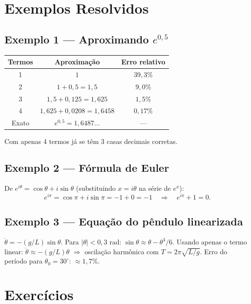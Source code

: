 \documentclass[12pt,a4paper]{article}
\begin{document}
\section*{Exemplos Resolvidos}

\subsection*{Exemplo 1 --- Aproximando $e^{0{,}5}$}
\begin{center}
\begin{tabular}{|c|c|c|}
\hline
Termos & Aproxima\c{c}\~ao & Erro relativo \\ \hline
1 & $1$ & $39{,}3\%$ \\ \hline
2 & $1 + 0{,}5 = 1{,}5$ & $9{,}0\%$ \\ \hline
3 & $1{,}5 + 0{,}125 = 1{,}625$ & $1{,}5\%$ \\ \hline
4 & $1{,}625 + 0{,}0208 = 1{,}6458$ & $0{,}17\%$ \\ \hline
Exato & $e^{0{,}5} = 1{,}6487\ldots$ & --- \\ \hline
\end{tabular}
\end{center}
Com apenas 4 termos j\'a se t\^em 3 casas decimais corretas.

\subsection*{Exemplo 2 --- F\'ormula de Euler}
De $e^{i\theta} = \cos\theta + i\sin\theta$ (substituindo $x = i\theta$ na s\'erie de $e^x$):
\[
e^{i\pi} = \cos\pi + i\sin\pi = -1 + 0 = -1 \quad \Rightarrow \quad e^{i\pi}+1=0.
\]

\subsection*{Exemplo 3 --- Equa\c{c}\~ao do p\^endulo linearizada}
$\ddot\theta = -(g/L)\sin\theta$. Para $|\theta| < 0{,}3$ rad: $\sin\theta \approx \theta - \theta^3/6$.
Usando apenas o termo linear: $\ddot\theta \approx -(g/L)\theta$ $\Rightarrow$ oscila\c{c}\~ao harm\^onica com $T = 2\pi\sqrt{L/g}$.
Erro do per\'iodo para $\theta_0=30^\circ$: $\approx 1{,}7\%$.

\section*{Exerc\'icios}
\end{document}
